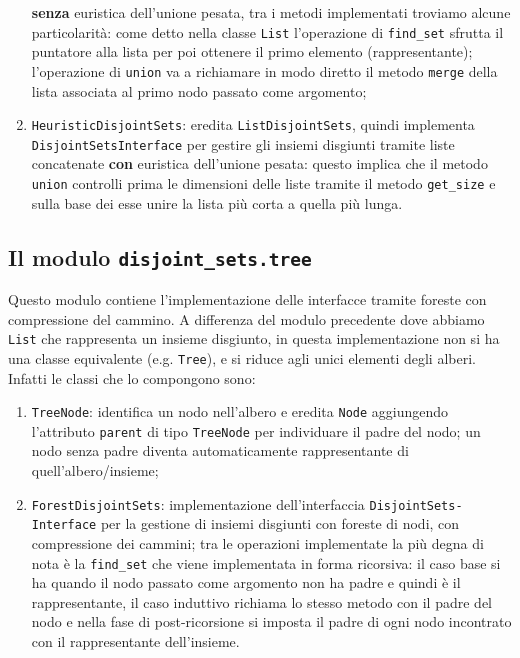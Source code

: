 \begin{enumerate}
            \textbf{senza} euristica dell'unione pesata, tra i metodi
            implementati troviamo alcune particolarità: come detto nella classe \texttt{List} l'operazione di \texttt{find\_set}
            sfrutta il puntatore alla lista per poi ottenere il primo elemento (rappresentante); l'operazione di \texttt{union}
            va a richiamare in modo diretto il metodo \texttt{merge} della lista associata al primo nodo passato come argomento;
      \item \texttt{HeuristicDisjointSets}: eredita \texttt{ListDisjointSets}, quindi implementa \texttt{DisjointSetsInterface}
            per gestire gli insiemi disgiunti tramite liste concatenate \textbf{con} euristica dell'unione pesata: questo implica
            che il metodo \texttt{union} controlli prima le dimensioni delle liste tramite il metodo \texttt{get\_size} e sulla base
            dei esse unire la lista più corta a quella più lunga.
\end{enumerate}

\subsection{Il modulo \texttt{disjoint\_sets.tree}}
Questo modulo contiene l'implementazione delle interfacce tramite foreste con compressione del cammino.
A differenza del modulo precedente dove abbiamo \texttt{List} che rappresenta un insieme disgiunto,
in questa implementazione non si ha una classe equivalente (e.g. \texttt{Tree}), e si riduce agli
unici elementi degli alberi. Infatti le classi che lo compongono sono:

\begin{enumerate}
      \item \texttt{TreeNode}: identifica un nodo nell'albero e eredita \texttt{Node} aggiungendo l'attributo \texttt{parent} di tipo \texttt{TreeNode}
            per individuare il padre del nodo; un nodo senza padre diventa automaticamente rappresentante di quell'albero/insieme;
      \item \texttt{ForestDisjointSets}: implementazione dell'interfaccia \texttt{DisjointSets-\linebreak Interface} per la gestione
            di insiemi disgiunti con foreste di nodi, con compressione dei cammini; tra le operazioni implementate la più degna di nota
            è la \texttt{find\_set} che viene implementata in forma ricorsiva: il caso base si ha quando il nodo passato come argomento
            non ha padre e quindi è il rappresentante, il caso induttivo richiama lo stesso metodo con il padre del nodo e nella fase di
            post-ricorsione si imposta il padre di ogni nodo incontrato con il rappresentante dell'insieme.
\end{enumerate}

